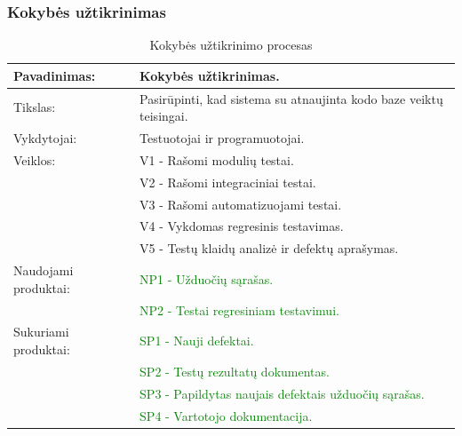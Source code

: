\documentclass{VUMIFPSkursinis}
\begin{document}
	\subsubsection{Kokybės užtikrinimas}
	\begin{center}
		\begin{table}[ht]
			\caption{Kokybės užtikrinimo procesas}
			\begin{tabular}{ | l | l | }
				\hline
				Pavadinimas:		& Kokybės užtikrinimas.							\\ \hline
				Tikslas:		& Pasirūpinti, kad sistema su atnaujinta kodo baze veiktų teisingai.	\\ \hline
				Vykdytojai:		& Testuotojai ir programuotojai.					\\ \hline
				Veiklos:		& V1 - Rašomi modulių testai.						\\
							& V2 - Rašomi integraciniai testai.					\\
							& V3 - Rašomi automatizuojami testai.					\\
							& V4 - Vykdomas regresinis testavimas.					\\
							& V5 - Testų klaidų analizė ir defektų aprašymas.			\\ \hline
				Naudojami produktai:	& \textcolor{green}{NP1 - Užduočių sąrašas.} 						\\
							& \textcolor{green}{NP2 - Testai regresiniam testavimui.}					\\ \hline
				Sukuriami produktai:	& \textcolor{green}{SP1 - Nauji defektai.	}						\\
							&\textcolor{green}{ SP2 - Testų rezultatų dokumentas.	}				\\
							& \textcolor{green}{SP3 - Papildytas naujais defektais užduočių sąrašas.}			\\ 
							& \textcolor{green}{SP4 - Vartotojo dokumentacija.} \\ \hline
			\end{tabular}
		\end{table}
	\end{center}
\end{document}
